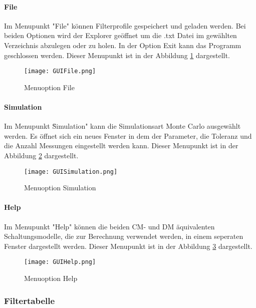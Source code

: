 \paragraph{File} \label{para:file}
Im Menupunkt "File" können Filterprofile gespeichert und geladen werden. Bei beiden Optionen wird der Explorer geöffnet um die .txt Datei im gewählten Verzeichnis abzulegen oder zu holen. In der Option Exit kann das Programm geschlossen werden. Dieser Menupunkt ist in der Abbildung \ref{fig:GUIFile}  dargestellt.

\begin{figure}[H]
	\centering
	\texttt{[image: GUIFile.png]}
	\caption{Menuoption File}
	\label{fig:GUIFile}
\end{figure}

\bigskip

\paragraph{Simulation} \label{para:simulation}
Im Menupunkt \"Simulation" kann die Simulationsart Monte Carlo ausgewählt werden. Es öffnet sich ein neues Fenster in dem der Parameter, die Toleranz und die Anzahl Messungen eingestellt werden kann. Dieser Menupunkt ist in der Abbildung \ref{fig:GUISimulation} dargestellt.

\begin{figure}[H]
	\centering
	\texttt{[image: GUISimulation.png]}
	\caption{Menuoption Simulation}
	\label{fig:GUISimulation}
\end{figure}

\bigskip

\paragraph{Help} \label{para:Help}
Im Menupunkt "Help" können die beiden CM- und DM äquivalenten Schaltungsmodelle, die zur Berechnung verwendet werden, in einem seperaten Fenster dargestellt werden. Dieser Menupunkt ist in der Abbildung \ref{fig:GUIHelp}  dargestellt.

\begin{figure}[H]
	\centering
	\texttt{[image: GUIHelp.png]}
	\caption{Menuoption Help}
	\label{fig:GUIHelp}
\end{figure}

\newpage

\subsubsection{Filtertabelle} \label{subsubsec:filtertabelle}


